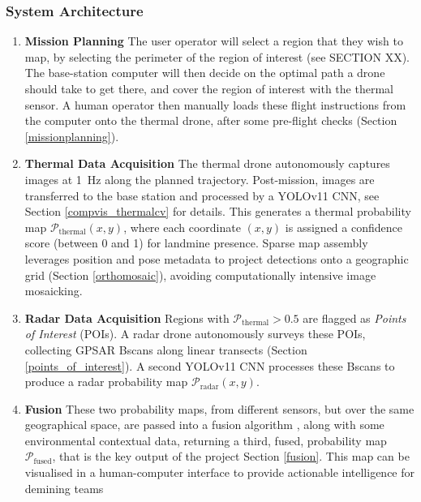 

    \subsubsection{System Architecture} \label{compvis_methods}
    
        \begin{enumerate}
        
            \item \textbf{Mission Planning} The user operator will select a region that they wish to map, by selecting the perimeter of the region of interest (see SECTION XX). The base-station computer will then decide on the optimal path a drone should take to get there, and cover the region of interest with the thermal sensor. A human operator then manually loads these flight instructions from the computer onto the thermal drone, after some pre-flight checks (Section \ref{missionplanning}).
            
            \item \textbf{Thermal Data Acquisition} The thermal drone autonomously captures images at 1~Hz along the planned trajectory. Post-mission, images are transferred to the base station and processed by a YOLOv11 CNN, see Section \ref{compvis_thermalcv} for details. This generates a thermal probability map \(\mathcal{P}_{\text{thermal}}(x,y)\), where each coordinate \((x,y)\) is assigned a confidence score (between 0 and 1) for landmine presence. Sparse map assembly leverages position and pose metadata to project detections onto a geographic grid  (Section \ref{orthomosaic}), avoiding computationally intensive image mosaicking.
            
            \item \textbf{Radar Data Acquisition} Regions with \(\mathcal{P}_{\text{thermal}} > 0.5\) are flagged as \textit{Points of Interest} (POIs). A radar drone autonomously surveys these POIs, collecting GPSAR Bscans along linear transects (Section \ref{points_of_interest}). A second YOLOv11 CNN processes these Bscans to produce a radar probability map \(\mathcal{P}_{\text{radar}}(x,y)\).
            
            \item \textbf{Fusion} These two probability maps, from different sensors, but over the same geographical space, are passed into a fusion algorithm , along with some environmental contextual data, returning a third, fused, probability map $\mathcal{P}_{\text{fused}}$, that is the key output of the project Section \ref{fusion}. This map can be visualised in a human-computer interface to provide actionable intelligence for demining teams
            
        \end{enumerate}


